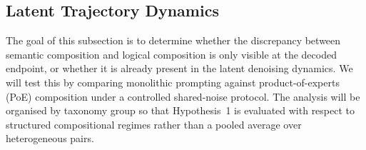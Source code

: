 

\subsection{Latent Trajectory Dynamics}
\label{subsec:trajectories}

The goal of this subsection is to determine whether the discrepancy between semantic composition and logical composition is only visible at the decoded endpoint, or whether it is already present in the latent denoising dynamics. We will test this by comparing monolithic prompting against product-of-experts (PoE) composition under a controlled shared-noise protocol. The analysis will be organised by taxonomy group so that Hypothesis~1 is evaluated with respect to structured compositional regimes rather than a pooled average over heterogeneous pairs.

